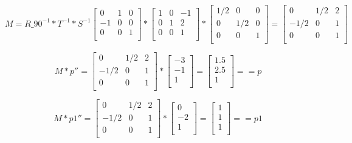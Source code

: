 \documentclass{article}
\begin{document}
\[
    M = R\_90^{-1} * T^{-1} * S^{-1}
    \begin{bmatrix}
        0  & 1 & 0 \\
        -1 & 0 & 0 \\
        0  & 0 & 1 \\
    \end{bmatrix}
    *
    \begin{bmatrix}
        1 & 0 & -1 \\
        0 & 1 & 2  \\
        0 & 0 & 1  \\
    \end{bmatrix}
    *
    \begin{bmatrix}
        1/2 & 0   & 0 \\
        0   & 1/2 & 0 \\
        0   & 0   & 1 \\
    \end{bmatrix}
    =
    \begin{bmatrix}
        0    & 1/2 & 2 \\
        -1/2 & 0   & 1 \\
        0    & 0   & 1 \\
    \end{bmatrix}
\]



\[
    M * p'' =
    \begin{bmatrix}
        0    & 1/2 & 2 \\
        -1/2 & 0   & 1 \\
        0    & 0   & 1 \\
    \end{bmatrix}
    *
    \begin{bmatrix}
        -3 \\
        -1 \\
        1  \\
    \end{bmatrix}
    =
    \begin{bmatrix}
        1.5 \\
        2.5 \\
        1   \\
    \end{bmatrix}
    == p
\]



\[
    M * p1'' =
    \begin{bmatrix}
        0    & 1/2 & 2 \\
        -1/2 & 0   & 1 \\
        0    & 0   & 1 \\
    \end{bmatrix}
    *
    \begin{bmatrix}
        0  \\
        -2 \\
        1  \\
    \end{bmatrix}
    =
    \begin{bmatrix}
        1 \\
        1 \\
        1 \\
    \end{bmatrix}
    == p1
\]
\end{document}
